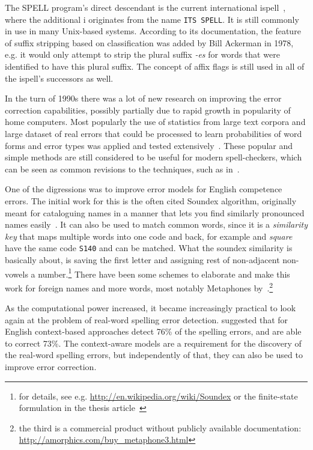 \documentclass[officiallayout,final]{unihelcompling}
\newcommand\misspelt{\bgroup\markoverwith
{\textcolor{red}{\lower3.5pt\hbox{\sixly \char58}}}\ULon}
\begin{document}
The SPELL program's direct descendant is the current international
ispell~\citep{gorin1971spell}, where the additional i originates from the name
\texttt{ITS SPELL}. It is still commonly in use in many Unix-based systems.
According to its documentation, the feature of suffix stripping based on
classification was added by Bill Ackerman in 1978, e.g. it would only attempt
to strip the plural suffix \emph{-es} for words that were identified to have
this plural suffix.  The concept of affix flags is still used in all of the
ispell's successors as well.

In the turn of 1990s there was a lot of new research on improving the error
correction capabilities, possibly partially due to rapid growth in popularity
of home computers. Most popularly the use of statistics from large text corpora
and large dataset of real errors that could be processed to learn probabilities
of word forms and error types was applied and tested
extensively~\citep{kernighan1990spelling,church1991probability}. These popular
and simple methods are still considered to be useful for modern spell-checkers,
which can be seen as common revisions to the techniques, such as
in~\citet{brill2000improved}.

One of the digressions was to improve \glspl{error model} for English
competence errors. The initial work for this is the often cited Soundex
algorithm, originally meant for cataloguing names in a manner that lets you
find similarly pronounced names easily~\citep{russell1918soundex}. It can also
be used to match common words, since it is a \emph{similarity key} that maps
multiple words into one code and back, for example \misspelt{squer} and
\emph{square} have the same code \texttt{S140} and can be matched.  What the
soundex similarity is basically about, is saving the first letter and assigning
rest of non-adjacent non-vowels a number.\footnote{for details, see e.g.
\url{http://en.wikipedia.org/wiki/Soundex} or the finite-state formulation in
the thesis article~} There have been some
schemes to elaborate and make this work for foreign names and more words, most
notably Metaphones
by~\citet{philips1990hanging,philips2000double}.\footnote{the third is a
commercial product without publicly available documentation:
\url{http://amorphics.com/buy_metaphone3.html}}

As the computational power increased, it became increasingly practical to look
again at the problem of real-word spelling error detection.
\citet{mays1991context} suggested that for English context-based
approaches detect 76\% of the spelling errors, and are able to correct 73\%.
The context-aware models are a requirement for the discovery of the real-word
spelling errors, but independently of that, they can also be used to improve
error correction. 
\end{document}

